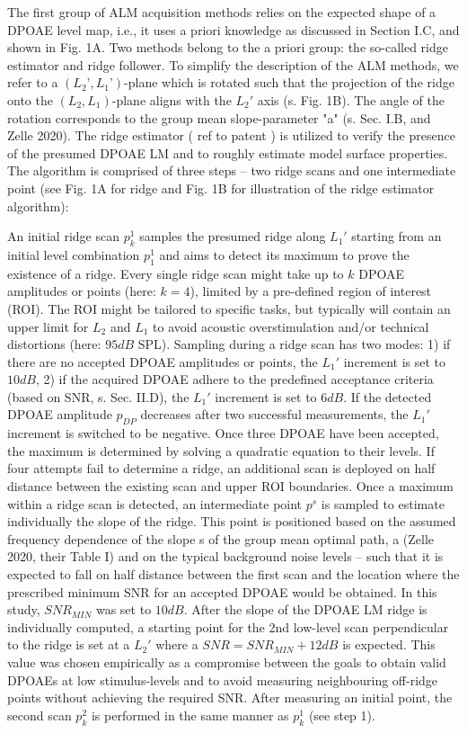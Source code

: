 \documentclass[journal,twoside,web]{ieeecolor2}
\begin{document}
The first group of ALM acquisition methods relies on the expected shape of a DPOAE level map, i.e., it uses a priori knowledge as discussed in Section I.C, and shown in Fig. 1A. Two methods belong to the a priori group: the so-called ridge estimator and ridge follower. To simplify the description of the ALM methods, we refer to a $(L_2’, L_1’)$-plane which is rotated such that the projection of the ridge onto the $(L_2, L_1)$-plane aligns with the $L_2'$ axis (s. Fig. 1B).  The angle of the rotation corresponds to the group mean slope-parameter "a" (s. Sec. I.B, and Zelle 2020).
The ridge estimator ( ref to patent ) is utilized to verify the presence of the presumed DPOAE LM and to roughly estimate model surface properties. The algorithm is comprised of three steps – two ridge scans and one intermediate point (see Fig. 1A for ridge and Fig. 1B for illustration of the ridge estimator algorithm):
\begin{algorithmic}[1]
\STATE An initial ridge scan $p_k^1$ samples the presumed ridge along $L_1'$ starting from an initial level combination $p_1^1$ and aims to detect its maximum to prove the existence of a ridge. Every single ridge scan might take up to $k$ DPOAE amplitudes or points (here: $k=4$), limited by a pre-defined region of interest (ROI). The ROI might be tailored to specific tasks, but typically will contain an upper limit for $L_2$ and $L_1$ to avoid acoustic overstimulation and/or technical distortions (here: $95 dB$ SPL). Sampling during a ridge scan has two modes: 1) if there are no accepted DPOAE amplitudes or points, the $L_1'$ increment is set to $10 dB$, 2) if the acquired DPOAE adhere to the predefined acceptance criteria (based on SNR, s. Sec. II.D), the $L_1'$ increment is set to $6 dB$. If the detected DPOAE amplitude $p_{DP}$ decreases after two successful measurements, the $L_1'$ increment is switched to be negative. Once three DPOAE have been accepted, the maximum is determined by solving a quadratic equation to their levels. If four attempts fail to determine a ridge, an additional scan is deployed on half distance between the existing scan and upper ROI boundaries.
\STATE Once a maximum within a ridge scan is detected, an intermediate point $p^s$ is sampled to estimate individually the slope of the ridge. This point is positioned based on the assumed frequency dependence of the slope s of the group mean optimal path, a (Zelle 2020, their Table I) and on the typical background noise levels – such that it is expected to fall on half distance between the first scan and the location where the prescribed minimum SNR for an accepted DPOAE would be obtained. In this study, $SNR_{MIN}$ was set to $10 dB$.
\STATE After the slope of the DPOAE LM ridge is individually computed, a starting point for the 2nd low-level scan perpendicular to the ridge is set at a $L_2'$ where a $SNR = SNR_{MIN} + 12 dB$ is expected. This value was chosen empirically as a compromise between the goals to obtain valid DPOAEs at low stimulus-levels and to avoid measuring neighbouring off-ridge points without achieving the required SNR. After measuring an initial point, the second scan $p_k^2$ is performed in the same manner as $p_k^1$ (see step 1).
\end{algorithmic} 
\end{document}
